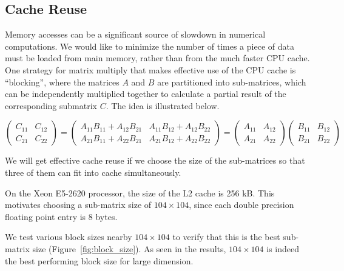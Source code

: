 \documentclass[fontsize=11pt]{scrartcl}
\numberwithin{equation}{section}        %
\numberwithin{figure}{section}          %
\numberwithin{table}{section}               %
\begin{document}
\subsection{Cache Reuse}
Memory accesses can be a significant source of slowdown in numerical computations.
We would like to minimize the number of times a piece of data must be loaded from
main memory, rather than from the much faster CPU cache.  One strategy for matrix
multiply that makes effective use of the CPU cache is ``blocking'', where the 
matrices $A$ and $B$ are partitioned into sub-matrices, which can be independently
multiplied together to calculate a partial result of the corresponding submatrix
$C$.  The idea is illustrated below.

\[\left( \begin{array}{cc}
C_{11} & C_{12} \\
C_{21} & C_{22} \end{array} \right)
= \left( \begin{array}{cc}
A_{11} B_{11} + A_{12} B_{21} & A_{11} B_{12} + A_{12} B_{22} \\
A_{21} B_{11} + A_{22} B_{21} & A_{21} B_{12} + A_{22} B_{22} \end{array} \right)
= \left( \begin{array}{cc}
A_{11} & A_{12} \\
A_{21} & A_{22} \end{array} \right)
\left( \begin{array}{cc}
B_{11} & B_{12} \\
B_{21} & B_{22} \end{array} \right)
\] 

We will get effective cache reuse if we choose the size of the sub-matrices so that
three of them can fit into cache simultaneously.

On the Xeon E5-2620 processor, the size of the L2 cache is 256 kB.  This motivates 
choosing a sub-matrix size of $104 \times 104$, since each double precision floating
point entry is 8 bytes.

We test various block sizes nearby $104 \times 104$ to verify that this is the best
sub-matrix size (Figure~\ref{fig:block_size}).  As seen in the results,
$104 \times 104$ is indeed the best performing block size for large dimension.
\end{document}
